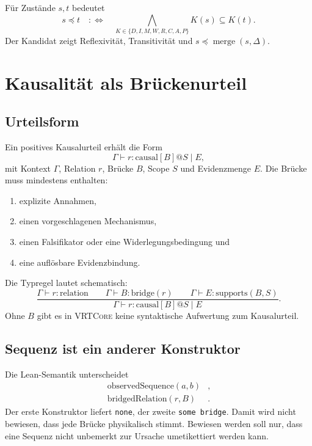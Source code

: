 \documentclass[11pt,a4paper]{article}
\newcommand{\VRTCore}{\textsc{VRTCore}}
\newcommand{\code}[1]{\texttt{#1}}
\begin{document}
Für Zustände \(s,t\) bedeutet
\begin{equation}
  s\preceq t
  \quad:\Longleftrightarrow\quad
  \bigwedge_{K\in\{D,I,M,W,R,C,A,P\}} K(s)\subseteq K(t).
\end{equation}
Der Kandidat zeigt Reflexivität, Transitivität und
\(s\preceq\operatorname{merge}(s,\Delta)\).

\section{Kausalität als Brückenurteil}

\subsection{Urteilsform}

Ein positives Kausalurteil erhält die Form
\begin{equation}
 \Gamma\vdash r:\mathrm{causal}[B]@S\mid E,
\end{equation}
mit Kontext \(\Gamma\), Relation \(r\), Brücke \(B\), Scope \(S\) und
Evidenzmenge \(E\). Die Brücke muss mindestens enthalten:

\begin{enumerate}
  \item explizite Annahmen,
  \item einen vorgeschlagenen Mechanismus,
  \item einen Falsifikator oder eine Widerlegungsbedingung und
  \item eine auflösbare Evidenzbindung.
\end{enumerate}

Die Typregel lautet schematisch:
\begin{equation}
\frac{
  \Gamma\vdash r:\mathrm{relation}
  \qquad
  \Gamma\vdash B:\mathrm{bridge}(r)
  \qquad
  \Gamma\vdash E:\mathrm{supports}(B,S)
}{
  \Gamma\vdash r:\mathrm{causal}[B]@S\mid E
}.
\end{equation}
Ohne \(B\) gibt es in \VRTCore{} keine syntaktische Aufwertung zum
Kausalurteil.

\subsection{Sequenz ist ein anderer Konstruktor}

Die Lean-Semantik unterscheidet
\begin{align}
 \mathrm{observedSequence}(a,b)&,\\
 \mathrm{bridgedRelation}(r,B)&.
\end{align}
Der erste Konstruktor liefert \code{none}, der zweite \code{some bridge}.
Damit wird nicht bewiesen, dass jede Brücke physikalisch stimmt. Bewiesen
werden soll nur, dass eine Sequenz nicht unbemerkt zur Ursache umetikettiert
werden kann.
\end{document}
